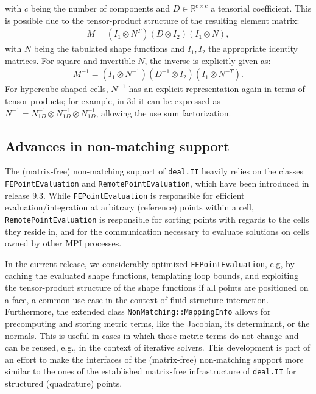 \documentclass{ansarticle-preprint}
\newcommand{\specialword}[1]{\texttt{#1}}
\newcommand{\dealii}{{\specialword{deal.II}}\xspace}
\begin{document}
\begin{itemize}
with $c$ being the number of components and $D\in \mathbb{R}^{c\times c}$ a tensorial
coefficient.
This is possible due to the tensor-product structure of the resulting element matrix:
\begin{align*}
M =  ( I_1 \otimes N^T) (D \otimes I_2 ) ( I_1 \otimes N),
\end{align*}
with $N$ being the tabulated shape functions and $I_1,I_2$ the appropriate identity matrices.
For square and invertible $N$, the inverse is explicitly given as:
\begin{align*}
M^{-1} =  ( I_1 \otimes N^{-1}) (D^{-1} \otimes I_2 ) ( I_1 \otimes N^{-T}).
\end{align*}
For hypercube-shaped cells, $N^{-1}$ has an explicit representation
again in terms of tensor products; for example, in 3d it can be
expressed as $N^{-1} = N_{1D}^{-1} \otimes N_{1D}^{-1} \otimes
N_{1D}^{-1}$, allowing the use sum factorization.
\end{itemize}

\subsection{Advances in non-matching support}\label{sec:nonmatching}

The (matrix-free) non-matching support of \dealii heavily relies
on the classes \texttt{FE\-Point\-Eval\-u\-ation} and \texttt{RemotePointEvaluation},
which have been introduced in release 9.3. While \texttt{FE\-Point\-Eval\-u\-a\-tion}
is responsible for efficient evaluation/integration at arbitrary (reference)
points within a cell, \texttt{RemotePointEvaluation} is responsible for
sorting points with regards to the cells they reside in, and for the
communication necessary to evaluate solutions on cells owned by other
MPI processes.

In the current release, we considerably optimized \texttt{FEPointEvaluation}, e.g,
by caching the evaluated shape functions, templating loop bounds, and
exploiting the tensor-product structure of the shape functions if all points are
positioned on a face, a common use case in the context of fluid-structure
interaction. Furthermore, the extended class \texttt{NonMatching::MappingInfo}
allows for precomputing and storing metric terms, like the Jacobian, its determinant,
or the normals. This is useful in cases in which these metric terms do not change
and can be reused, e.g., in the context of iterative solvers. This development
is part of an effort to make the interfaces of the 
(matrix-free) non-matching support more similar to the ones of the 
established matrix-free infrastructure of \dealii for structured (quadrature) points.
\end{document}
